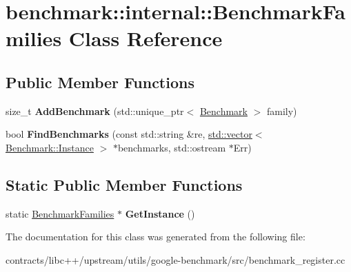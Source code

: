 \hypertarget{classbenchmark_1_1internal_1_1_benchmark_families}{}\section{benchmark\+:\+:internal\+:\+:Benchmark\+Families Class Reference}
\label{classbenchmark_1_1internal_1_1_benchmark_families}
\subsection*{Public Member Functions}
\begin{DoxyCompactItemize}
\item 
\mbox{\label{classbenchmark_1_1internal_1_1_benchmark_families_a06c191ad55c4df9425c3ff6ba9ea817a}} 
size\+\_\+t {\bfseries Add\+Benchmark} (std\+::unique\+\_\+ptr$<$ \mbox{\hyperlink{classbenchmark_1_1internal_1_1_benchmark}{Benchmark}} $>$ family)
\item 
\mbox{\label{classbenchmark_1_1internal_1_1_benchmark_families_a2dc8f3a9709e9efb74ffdc6463ee0ce2}} 
bool {\bfseries Find\+Benchmarks} (const std\+::string \&re, \mbox{\hyperlink{classstd_1_1vector}{std\+::vector}}$<$ \mbox{\hyperlink{structbenchmark_1_1internal_1_1_benchmark_1_1_instance}{Benchmark\+::\+Instance}} $>$ $\ast$benchmarks, std\+::ostream $\ast$Err)
\end{DoxyCompactItemize}
\subsection*{Static Public Member Functions}
\begin{DoxyCompactItemize}
\item 
\mbox{\label{classbenchmark_1_1internal_1_1_benchmark_families_adfeb34c10af889264281ea99b9c81433}} 
static \mbox{\hyperlink{classbenchmark_1_1internal_1_1_benchmark_families}{Benchmark\+Families}} $\ast$ {\bfseries Get\+Instance} ()
\end{DoxyCompactItemize}


The documentation for this class was generated from the following file\+:\begin{DoxyCompactItemize}
\item 
contracts/libc++/upstream/utils/google-\/benchmark/src/benchmark\+\_\+register.\+cc\end{DoxyCompactItemize}
